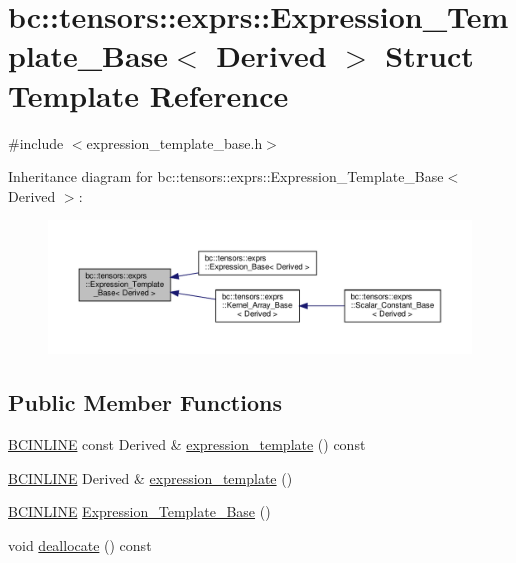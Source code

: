 \hypertarget{structbc_1_1tensors_1_1exprs_1_1Expression__Template__Base}{}\section{bc\+:\+:tensors\+:\+:exprs\+:\+:Expression\+\_\+\+Template\+\_\+\+Base$<$ Derived $>$ Struct Template Reference}
\label{structbc_1_1tensors_1_1exprs_1_1Expression__Template__Base}


{\ttfamily \#include $<$expression\+\_\+template\+\_\+base.\+h$>$}



Inheritance diagram for bc\+:\+:tensors\+:\+:exprs\+:\+:Expression\+\_\+\+Template\+\_\+\+Base$<$ Derived $>$\+:\nopagebreak
\begin{figure}[H]
\begin{center}
\leavevmode
\includegraphics[width=350pt]{structbc_1_1tensors_1_1exprs_1_1Expression__Template__Base__inherit__graph}
\end{center}
\end{figure}
\subsection*{Public Member Functions}
\begin{DoxyCompactItemize}
\item 
\hyperlink{common_8h_a6699e8b0449da5c0fafb878e59c1d4b1}{B\+C\+I\+N\+L\+I\+NE} const Derived \& \hyperlink{structbc_1_1tensors_1_1exprs_1_1Expression__Template__Base_a9c8ce38a75c495a814c475e4a4a32bb2}{expression\+\_\+template} () const
\item 
\hyperlink{common_8h_a6699e8b0449da5c0fafb878e59c1d4b1}{B\+C\+I\+N\+L\+I\+NE} Derived \& \hyperlink{structbc_1_1tensors_1_1exprs_1_1Expression__Template__Base_ae8db5acbe138f3e4f1da7b7ee45425e2}{expression\+\_\+template} ()
\item 
\hyperlink{common_8h_a6699e8b0449da5c0fafb878e59c1d4b1}{B\+C\+I\+N\+L\+I\+NE} \hyperlink{structbc_1_1tensors_1_1exprs_1_1Expression__Template__Base_a01bd54191d7105143bf41ae87dd3a6d7}{Expression\+\_\+\+Template\+\_\+\+Base} ()
\item 
void \hyperlink{structbc_1_1tensors_1_1exprs_1_1Expression__Template__Base_a84ea347f23d712ab43ce175839153a5a}{deallocate} () const
\end{DoxyCompactItemize}


